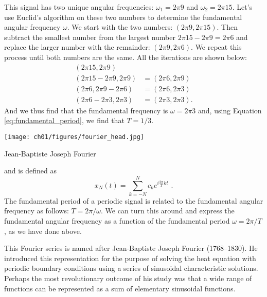 This signal has two unique angular frequencies: $\omega_1 = 2\pi 9$ and $\omega_2 = 2\pi 15$.
Let's use Euclid's algorithm on these two numbers to determine the fundamental angular frequency $\omega$.
We start with the two numbers: $(2\pi 9, 2\pi15)$. Then subtract the smallest number from the
largest number $2\pi 15 - 2\pi 9 = 2\pi 6$ and replace the larger number with the remainder: $(2\pi 9, 2\pi 6)$.
We repeat this process until both numbers are the same.
All the iterations are shown below:
\begin{align*}
  (2\pi 15, 2\pi 9)        &                     \\
  (2\pi 15-2\pi 9, 2\pi 9) & = (2\pi 6, 2\pi 9)  \\
  (2\pi 6, 2\pi 9-2\pi 6)  & = (2\pi 6, 2\pi 3)  \\
  (2\pi 6-2\pi 3, 2\pi 3)  & = (2\pi 3, 2\pi 3).
\end{align*}
And we thus find that the fundamental frequency is $\omega=2\pi 3$ and, using
Equation \ref{eq:fundamental_period}, we find that $T = 1/3$.

\begin{marginfigure}[1cm]
  \begin{center}
    \texttt{[image: ch01/figures/fourier\_head.jpg]}
  \end{center}
  \caption{Jean-Baptiste Joseph Fourier}
  \label{fig:joe_fourier2}
\end{marginfigure}

 and is defined as
\begin{equation}
  \boxed{
    x_N(t) = \sum_{k=-N}^{N} c_k e^{i \frac{2\pi}{T} k t}
    \label{eq:synthesis_eq}
  } \,\,.
\end{equation}
The fundamental period of a periodic signal is related to the fundamental angular frequency
as follows: $T=2\pi/\omega$.
We can turn this around and express the fundamental angular frequency as a function of
the fundamental period $\omega=2\pi/T$, as we have done above.


This Fourier series is named after Jean-Baptiste Joseph Fourier (1768–1830).
He introduced this representation for the purpose of solving the heat equation with
periodic boundary conditions using a series of sinusoidal characteristic solutions.
Perhaps the most revolutionary outcome of his study was that a wide range of functions
can be represented as a sum of elementary sinusoidal functions.

